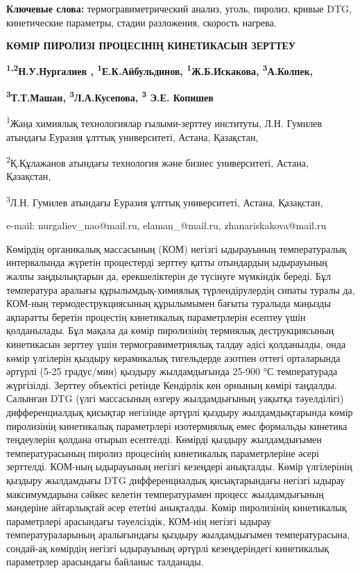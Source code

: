 {\bfseries Ключевые слова:} термогравиметрический анализ, уголь, пиролиз,
кривые DTG, кинетические параметры, стадии разложения, скорость нагрева.

{\bfseries КӨМІР ПИРОЛИЗІ ПРОЦЕСІНІҢ КИНЕТИКАСЫН ЗЕРТТЕУ}

{\bfseries \textsuperscript{1,2}Н.У.Нургалиев ,
\textsuperscript{1}Е.К.Айбульдинов, \textsuperscript{1}Ж.Б.Искакова,
\textsuperscript{3}А.Колпек,}

{\bfseries \textsuperscript{3}Т.Т.Машан, \textsuperscript{3}Л.А.Кусепова,
\textsuperscript{3} Э.Е. Копишев}

\textsuperscript{1}Жаңа химиялық технологиялар ғылыми-зерттеу институты,
Л.Н. Гумилев атындағы Еуразия ұлттық университеті, Астана, Қазақстан,

\textsuperscript{2}Қ.Құлажанов атындағы технология және бизнес
университеті, Астана, Қазақстан,

\textsuperscript{3}Л.Н. Гумилев атындағы Еуразия ұлттық университеті,
Астана, Қазақстан,

e-mail: nurgaliev\_nao@mail.ru, elaman\_@mail.ru, zhanariskakova@mail.ru

Көмірдің органикалық массасының (КОМ) негізгі ыдырауының температуралық
интервалында жүретін процестерді зерттеу қатты отындардың ыдырауының
жалпы заңдылықтарын да, ерекшеліктерін де түсінуге мүмкіндік береді. Бұл
температура аралығы құрылымдық-химиялық түрлендірулердің сипаты туралы
да, КОМ-ның термодеструкциясының құрылымымен бағыты туралыда маңызды
ақпаратты беретін процестің кинетикалық параметрлерін есептеу үшін
қолданылады. Бұл мақала да көмір пиролизінің термиялық деструкциясының
кинетикасын зерттеу үшін термогравиметриялық талдау әдісі қолданылды,
онда көмір үлгілерін қыздыру керамикалық тигельдерде азотпен оттегі
орталарында әртүрлі (5-25 градус/мин) қыздыру жылдамдығында 25-900 °С
температурада жүргізілді. Зерттеу объектісі ретінде Кендірлік кен
орнының көмірі таңдалды. Салынған DTG (үлгі массасының өзгеру
жылдамдығының уақытқа тәуелділігі) дифференциалдық қисықтар негізінде
әртүрлі қыздыру жылдамдықтарында көмір пиролизінің кинетикалық
параметрлері изотермиялық емес формальды кинетика теңдеулерін қолдана
отырып есептелді. Көмірді қыздыру жылдамдығымен температурасының пиролиз
процесінің кинетикалық параметрлеріне әсері зерттелді. КОМ-ның
ыдырауының негізгі кезеңдері анықталды. Көмір үлгілерінің қыздыру
жылдамдығы DTG дифференциалдық қисықтарындағы негізгі ыдырау
максимумдарына сәйкес келетін температурамен процесс жылдамдығының
мәндеріне айтарлықтай әсер ететіні анықталды. Көмір пиролизінің
кинетикалық параметрлері арасындағы тәуелсіздік, КОМ-нің негізгі ыдырау
температураларының аралығындағы қыздыру жылдамдығымен температурасына,
сондай-ақ көмірдің негізгі ыдырауының әртүрлі кезеңдеріндегі кинетикалық
параметрлер арасындағы байланыс талданады.

